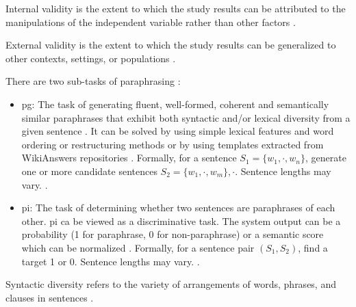 \begin{definition}
    Internal validity is the extent to which the study results can be attributed 
    to the manipulations of the independent variable rather than other factors \cite{master_thesis_paraphrasing_2024}.
\end{definition}

\begin{definition}
    External validity is the extent to which the study results can be generalized 
    to other contexts, settings, or populations \cite{master_thesis_paraphrasing_2024}.
\end{definition}

\begin{definition}
    There are two sub-tasks of paraphrasing \cite{palivela_optimization_2021}:
    \begin{itemize}
        \item \ac{pg}: The task of generating fluent, well-formed, coherent and semantically similar paraphrases 
        that exhibit both syntactic and/or lexical diversity from a given sentence \cite{palivela_optimization_2021,kurt_pehlivanoglu_comparative_2024}. 
        It can be solved by using simple lexical features and word ordering or restructuring methods or 
        by using templates extracted from WikiAnswers repositories \cite{palivela_optimization_2021}.
        Formally, for a sentence $S_1=\{w_1, \cdot, w_n\}$, generate one or more candidate sentences $S_2=\{w_1, \cdot, w_m\}, \cdot$.
        Sentence lengths may vary. \cite{palivela_optimization_2021}.
        \item \ac{pi}: The task of determining whether two sentences are paraphrases of each other.
        \ac{pi} ca be viewed as a discriminative task. The system output can be a probability (1 for paraphrase, 0 for non-paraphrase) 
        or a semantic score which can be normalized \cite{palivela_optimization_2021}.
        Formally, for a sentence pair $(S_1, S_2)$, find a target 1 or 0. Sentence lengths may vary. \cite{palivela_optimization_2021}.
    \end{itemize}
\end{definition}

\begin{definition}
    Syntactic diversity refers to the variety of arrangements of words, phrases, and clauses in sentences \cite{kurt_pehlivanoglu_comparative_2024}.
\end{definition}

